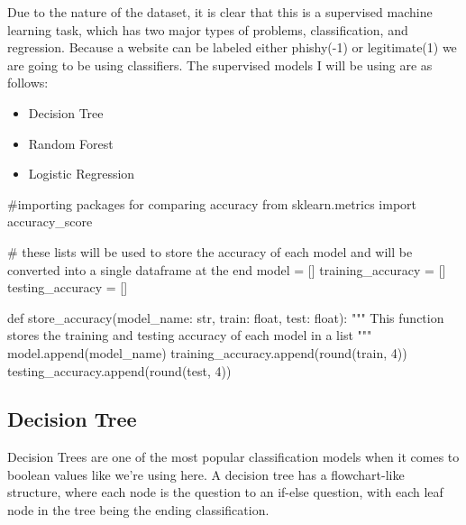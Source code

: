 \documentclass[
  letterpaper,
  DIV=11,
  numbers=noendperiod]{scrartcl}
\newenvironment{Shaded}{\begin{snugshade}}{\end{snugshade}}
\newcommand{\BuiltInTok}[1]{\textcolor[rgb]{0.00,0.23,0.31}{#1}}
\newcommand{\CommentTok}[1]{\textcolor[rgb]{0.37,0.37,0.37}{#1}}
\newcommand{\DecValTok}[1]{\textcolor[rgb]{0.68,0.00,0.00}{#1}}
\newcommand{\ImportTok}[1]{\textcolor[rgb]{0.00,0.46,0.62}{#1}}
\newcommand{\KeywordTok}[1]{\textcolor[rgb]{0.00,0.23,0.31}{#1}}
\newcommand{\NormalTok}[1]{\textcolor[rgb]{0.00,0.23,0.31}{#1}}
\newcommand{\OperatorTok}[1]{\textcolor[rgb]{0.37,0.37,0.37}{#1}}
\providecommand{\tightlist}{%
  \setlength{\itemsep}{0pt}\setlength{\parskip}{0pt}}\usepackage{longtable,booktabs,array}
\begin{document}
Due to the nature of the dataset, it is clear that this is a supervised
machine learning task, which has two major types of problems,
classification, and regression. Because a website can be labeled either
phishy(-1) or legitimate(1) we are going to be using classifiers. The
supervised models I will be using are as follows:

\begin{itemize}
\tightlist
\item
  Decision Tree
\item
  Random Forest
\item
  Logistic Regression
\end{itemize}

\begin{Shaded}
\begin{Highlighting}[]
\CommentTok{\#importing packages for comparing accuracy}
\ImportTok{from}\NormalTok{ sklearn.metrics }\ImportTok{import}\NormalTok{ accuracy\_score}

\CommentTok{\# these lists will be used to store the accuracy of each model and will be converted into a single dataframe at the end}
\NormalTok{model }\OperatorTok{=}\NormalTok{ []}
\NormalTok{training\_accuracy }\OperatorTok{=}\NormalTok{ []}
\NormalTok{testing\_accuracy }\OperatorTok{=}\NormalTok{ []}

\KeywordTok{def}\NormalTok{ store\_accuracy(model\_name: }\BuiltInTok{str}\NormalTok{, train: }\BuiltInTok{float}\NormalTok{, test: }\BuiltInTok{float}\NormalTok{):}
    \CommentTok{"""}
\CommentTok{    This function stores the training and testing accuracy of each model in a list}
\CommentTok{    """}
\NormalTok{    model.append(model\_name)}
\NormalTok{    training\_accuracy.append(}\BuiltInTok{round}\NormalTok{(train, }\DecValTok{4}\NormalTok{))}
\NormalTok{    testing\_accuracy.append(}\BuiltInTok{round}\NormalTok{(test, }\DecValTok{4}\NormalTok{))}
\end{Highlighting}
\end{Shaded}

\hypertarget{decision-tree}{%
\subsection{Decision Tree}\label{decision-tree}}

Decision Trees are one of the most popular classification models when it
comes to boolean values like we're using here. A decision tree has a
flowchart-like structure, where each node is the question to an if-else
question, with each leaf node in the tree being the ending
classification.
\end{document}
